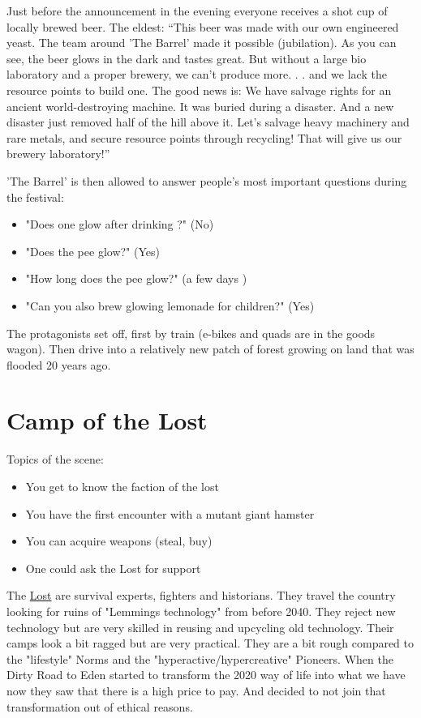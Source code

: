Just before the announcement in the evening everyone receives a shot cup of locally brewed beer. The eldest: “This beer was made with our own engineered yeast. The team around 'The Barrel' made it possible (jubilation). As you can see, the beer glows in the dark and tastes great. But without a large bio laboratory and a proper brewery, we can't produce more. . . and we lack the resource points to build one. The good news is: We have salvage rights for an ancient world-destroying machine. It was buried during a  disaster. And a new disaster just removed half of the hill above it. Let's salvage heavy machinery and rare metals, and secure resource points through recycling! That will give us our brewery laboratory!”

'The Barrel' is then allowed to answer people's most important questions during the festival:
\begin{itemize}
\item "Does one glow after drinking ?" (No)
\item "Does the pee glow?" (Yes)
\item "How long does the pee glow?" (a few days )
\item "Can you also brew glowing lemonade for children?" (Yes)
\end{itemize}

The protagonists set off, first by train (e-bikes and quads are in the goods wagon). Then drive into a relatively new patch of forest growing on land that was flooded 20 years ago.


\section{Camp of the Lost}

Topics of the scene:

\begin{itemize}
\item You get to know the faction of the lost
\item You have the first encounter with a mutant giant hamster
\item You can acquire weapons (steal, buy)
\item One could ask the Lost for support
\end{itemize}

\begin{sidebarBox}[title=The Lost]
The \hyperref[sec:Lost]{Lost} are survival experts, fighters and historians. They travel the country looking for ruins of "Lemmings technology" from before 2040. They reject new technology but are very skilled in reusing and upcycling old technology. Their camps look a bit ragged but are very practical. They are a bit rough compared to the "lifestyle" Norms and the "hyperactive/hypercreative" Pioneers. When the Dirty Road to Eden started to transform the 2020 way of life into what we have now they saw that there is a high price to pay. And decided to not join that transformation out of ethical reasons.
\end{sidebarBox}

